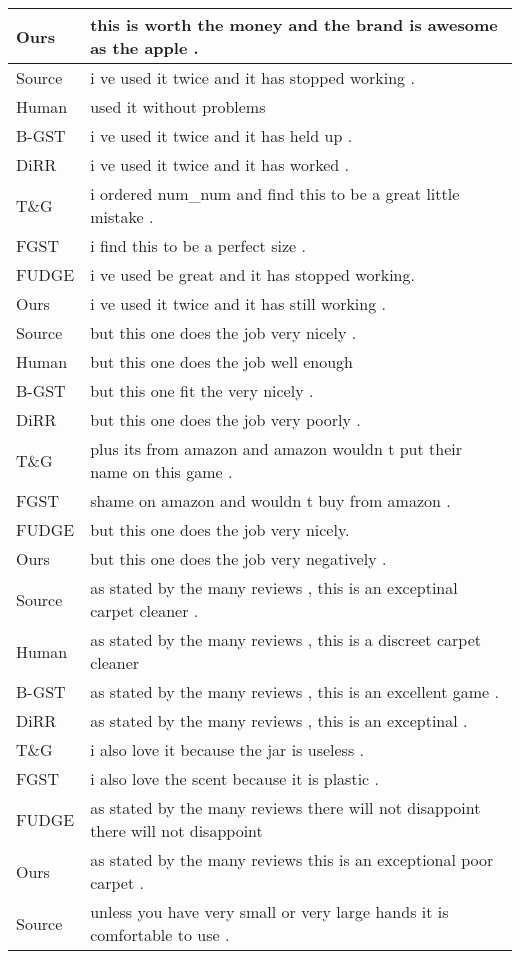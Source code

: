 \documentclass[11pt]{article}
\begin{document}
\begin{table}[ht]
\begin{tabular}{ll}
Ours&this is worth the money and the brand is awesome as the apple .\\
\midrule[1pt]
Source&i ve used it twice and it has stopped working .\\
Human&used it without problems\\
\midrule
B-GST&i ve used it twice and it has held up .\\
DiRR&i ve used it twice and it has worked .\\
T\&G&i ordered num\_num and find this to be a great little mistake .\\
FGST&i find this to be a perfect size .\\\midrule
FUDGE&i ve used be great and it has stopped working.\\
Ours&i ve used it twice and it has still working .\\
\midrule[1pt]
Source&but this one does the job very nicely .\\
Human&but this one does the job well enough\\
\midrule
B-GST&but this one fit the very nicely .\\
DiRR&but this one does the job very poorly .\\
T\&G&plus its from amazon and amazon wouldn t put their name on this game .\\
FGST&shame on amazon and wouldn t buy from amazon .\\\midrule
FUDGE&but this one does the job very nicely.\\
Ours&but this one does the job very negatively .\\
\midrule[1pt]
Source&as stated by the many reviews ,  this is an exceptinal carpet cleaner .\\
Human&as stated by the many reviews , this is a discreet carpet cleaner\\
\midrule
B-GST&as stated by the many reviews , this is an excellent game .\\
DiRR&as stated by the many reviews , this is an exceptinal .\\
T\&G&i also love it because the jar is useless .\\
FGST&i also love the scent because it is plastic .\\\midrule
FUDGE&as stated by the many reviews there will not disappoint there will not disappoint \\
Ours&as stated by the many reviews this is an exceptional poor carpet .\\
\midrule[1pt]
Source&unless you have very small or very large hands it is comfortable to use .\\

\end{tabular}
\end{table}
\end{document}
